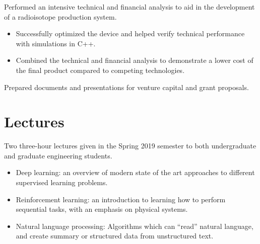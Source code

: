 \documentclass[]{deedy-resume-openfont}
\begin{document}
\begin{minipage}[t]{0.66\textwidth}
\begin{tightemize}
\item Performed an intensive technical and financial analysis to aid in the development of a radioisotope production system.
  \begin{itemize}
  \item Successfully optimized the device and helped verify technical performance with simulations in C++.
  \item Combined the technical and financial analysis to demonstrate a lower cost of the final product compared to competing technologies.
  \end{itemize}
\item Prepared documents and presentations for venture capital and grant proposals.
\end{tightemize}
\sectionsep


\section{Lectures}
\begin{tightemize}
\item Two three-hour lectures given in the Spring 2019 semester to both undergraduate and graduate engineering students.
	\begin{itemize}
	\item Deep learning: an overview of modern state of the art approaches to different supervised learning problems.
	\item Reinforcement learning: an introduction to learning how to perform sequential tasks, with an emphasis on physical systems.
	\item Natural language processing: Algorithms which can ``read'' natural language, and create summary or structured data from unstructured text.
	\end{itemize}
\end{tightemize}


\end{minipage}
\end{document}

